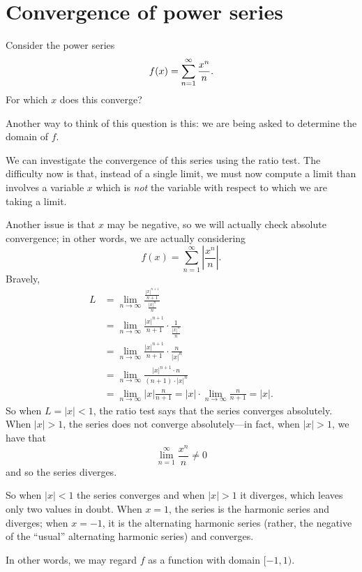\section{Convergence of power series}
\label{section:convergence-of-power-series}


\begin{example}
\label{example:power-series-xn-over-n}
Consider the power series
$$f(x) = \sum_{n=1}^\infty {x^n\over n}.$$
For which $x$ does this converge?
\end{example}

Another way to think of this question is this: we are being asked to
determine the domain of $f$.

\begin{solution}
  We can investigate the convergence of this series using the ratio
  test.  The difficulty now is that, instead of a single limit, we
  must now compute a limit than involves a variable $x$ which is
  \textit{not} the variable with respect to which we are taking a
  limit.  

  Another issue is that $x$ may be negative, so we will actually check
  absolute convergence; in other words, we are actually considering
  $$
  f(x) = \sum_{n=1}^\infty \left| \frac{x^n}{n} \right|.
  $$
  Bravely,
  \begin{align*}
    L &= \lim_{n\to\infty} \frac{\frac{|x|^{n+1}}{n+1}}{\frac{|x|^{n}}{n}} \\
      &= \lim_{n\to\infty} \frac{|x|^{n+1}}{n+1} \cdot \frac{1}{\frac{|x|^{n}}{n}} \\
      &= \lim_{n\to\infty} \frac{|x|^{n+1}}{n+1} \cdot \frac{n}{|x|^{n}} \\
      &= \lim_{n\to\infty} \frac{|x|^{n+1} \cdot n}{(n+1) \cdot |x|^{n}} \\
      &= \lim_{n\to\infty} |x| \frac{n}{n+1} = |x| \cdot \lim_{n\to\infty} \frac{n}{n+1} = |x|.
  \end{align*}
  So when $L = |x| < 1$, the ratio test says that the series converges
  absolutely.  When $|x| > 1$, the series does not converge
  absolutely---in fact, when $|x| > 1$, we have that
  $$
  \lim_{n=1}^\infty \frac{x^n}{n} \neq 0
  $$
  and so the series diverges.

  So when $|x|<1$ the series converges and when $|x|>1$ it diverges,
  which leaves only two values in doubt. When $x=1$, the series is the
  harmonic series and diverges; when $x=-1$, it is the alternating
  harmonic series (rather, the negative of the ``usual'' alternating
  harmonic series) and converges. 

  In other words, we may regard $f$ as a function with domain $[-1,1)$.
\end{solution}

